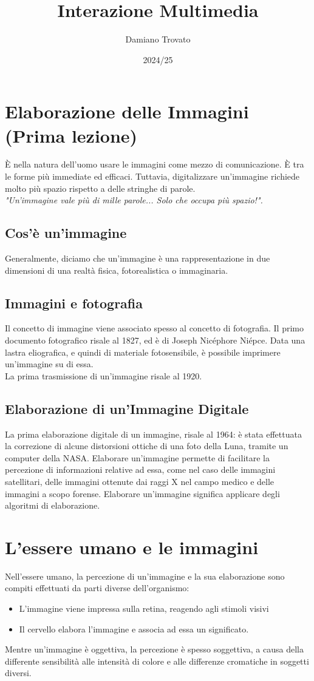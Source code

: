 \documentclass{report}
\title{Interazione Multimedia}
\author{Damiano Trovato}
\date{2024/25}
\begin{document}
\maketitle
\renewcommand{\contentsname}{Indice}
\renewcommand{\chaptername}{Capitolo}
\newpage
\tableofcontents
\newpage
\chapter{Elaborazione delle Immagini (Prima lezione)}
È nella natura dell'uomo usare le immagini come mezzo di comunicazione.
È tra le forme più immediate ed efficaci.
Tuttavia, digitalizzare un'immagine richiede molto più spazio rispetto a delle stringhe di parole.\\
\textit{"Un'immagine vale più di mille parole... Solo che occupa più spazio!".}
\section{Cos'è un'immagine}
Generalmente, diciamo che un'immagine è una rappresentazione in due dimensioni di una realtà fisica, fotorealistica o immaginaria.
\section{Immagini e fotografia}
Il concetto di immagine viene associato spesso al concetto di fotografia.
Il primo documento fotografico risale al 1827, ed è di Joseph Nicéphore Niépce.
Data una lastra eliografica, e quindi di materiale fotosensibile, è possibile imprimere un'immagine su di essa.\\
La prima trasmissione di un'immagine risale al 1920.

\section{Elaborazione di un'Immagine Digitale}
La prima elaborazione digitale di un immagine, risale al 1964: è stata effettuata la correzione di alcune distorsioni ottiche di una foto della Luna, tramite un computer della NASA.
Elaborare un'immagine permette di facilitare la percezione di informazioni relative ad essa, come nel caso delle immagini satellitari, delle immagini ottenute dai raggi X nel campo medico e delle immagini a scopo forense.
Elaborare un'immagine significa applicare degli algoritmi di elaborazione.

\chapter{L'essere umano e le immagini}
Nell'essere umano, la percezione di un'immagine e la sua elaborazione sono compiti effettuati da parti diverse dell'organismo:
\begin{itemize}
	\item L'immagine viene impressa sulla retina, reagendo agli stimoli visivi
	\item Il cervello elabora l'immagine e associa ad essa un significato.
\end{itemize}
Mentre un'immagine è oggettiva, la percezione è spesso soggettiva, a causa della differente sensibilità alle intensità di colore e alle differenze cromatiche in soggetti diversi. 
\newpage
\end{document}
